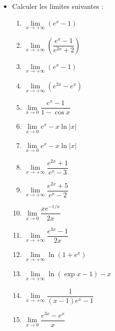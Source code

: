 \documentclass[12pt]{article}
\begin{document}
\setlength{\columnseprule}{0.4pt} %

\begin{itemize}
\item Calculer les limites suivantes :
    \begin{multicols}{3}
        \begin{enumerate}
        \item $\lim\limits_{x \to +\infty} (e^x - 1)$
        \item $\lim\limits_{x \to +\infty} \left(\dfrac{e^x - 1}{e^{2x} + 2}\right)$
        \item $\lim\limits_{x \to +\infty} (e^x - 1)$
        \item $\lim\limits_{x \to +\infty} (e^{2x} - e^x)$
        \item $\lim\limits_{x \to 0} \dfrac{e^x - 1}{1 - \cos x}$
        \item $\lim\limits_{x \to 0} e^x - x \ln|x|$
        \item $\lim\limits_{x \to 0} e^x - x \ln |x|$
        \item $\lim\limits_{x \to +\infty} \dfrac{e^{2x} + 1}{e^x - 3}$
        \item $\lim\limits_{x \to +\infty} \dfrac{e^{2x} + 5}{e^x - 2}$
        \item $\lim\limits_{x \to 0} \dfrac{xe^{-1/x}}{2x}$
        \item $\lim\limits_{x \to +\infty} \dfrac{e^{3x} - 1}{2x}$
        \item $\lim\limits_{x \to +\infty} \ln(1+e^x)$
        \item $\lim\limits_{x \to +\infty} \ln(\exp x-1)-x$
        \item $\lim\limits_{x \to +\infty} \dfrac{1}{(x-1)e^x -1}$
        \item $\lim\limits_{x \to 0} \dfrac{e^{3x} - e^x}{x}$
        \end{enumerate}
    \end{multicols}
\end{itemize}
\end{document}
